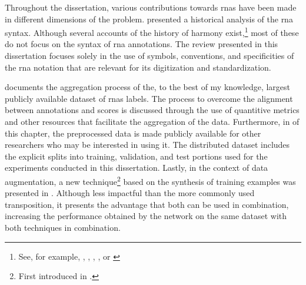 
Throughout the dissertation, various contributions towards
\glspl{rna} have been made in different dimensions of the
problem. 
presented a historical analysis of the \gls{rna} syntax.
Although several accounts of the history of harmony
exist,\footnote{See, for example,
\textcite{wason1985viennese}, \textcite{grave1988praise},
\textcite{christensen2002tonality},
\textcite{laitz2010graduate}, or
\textcite{sansallovich2013quintas}} most of these do not
focus on the syntax of \gls{rna} annotations. The review
presented in this dissertation focuses solely in the use of
symbols, conventions, and specificities of the \gls{rna}
notation that are relevant for its digitization and
standardization.

 documents the
aggregation process of the, to the best of my knowledge,
largest publicly available dataset of \glspl{rna} labels.
The process to overcome the alignment between annotations
and scores is discussed through the use of quantitive
metrics and other resources that facilitate the aggregation
of the data. Furthermore, in  of
this chapter, the preprocessed data is made publicly
available for other researchers who may be interested in
using it. The distributed dataset includes the explicit
splits into training, validation, and test portions used for
the experiments conducted in this dissertation. Lastly, in
the context of data augmentation, a new
technique\footnote{First introduced in
\textcite{napoleslopez2021augmentednet}.} based on the
synthesis of training examples was presented in
. Although less
impactful than the more commonly used transposition, it
presents the advantage that both can be used in combination,
increasing the performance obtained by the network on the
same dataset with both techniques in combination.

